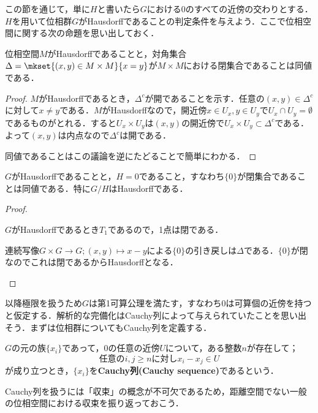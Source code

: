 この節を通じて，単に$H$と書いたら$G$における$0$のすべての近傍の交わりとする．$H$を用いて位相群$G$がHausdorffであることの判定条件を与えよう．ここで位相空間に関する次の命題を思い出しておく．

\begin{prop}
	位相空間$M$がHausdorffであることと，対角集合$\Delta=\mkset{(x,y)\in M\times M}{x=y}$が$M\times M$における閉集合であることは同値である．
\end{prop}
\begin{proof}
	$M$がHausdorffであるとき，$\Delta^c$が開であることを示す．任意の$(x,y)\in\Delta^c$に対して$x\neq y$である．$M$がHausdorffなので，開近傍$x\in U_x,y\in U_y$で$U_x\cap U_y=\emptyset$であるものがとれる．すると$U_x\times U_y$は$(x,y)$の開近傍で$U_x\times U_y\subset\Delta^c$である．よって$(x,y)$は内点なので$\Delta^c$は開である．
	
	同値であることはこの議論を逆にたどることで簡単にわかる．
\end{proof}

\begin{prop}\label{prop:位相群がHdfになる条件}
	$G$がHausdorffであることと，$H=0$であること，すなわち$\{0\}$が閉集合であることは同値である．特に$G/H$はHausdorffである．
\end{prop}

\begin{proof}
	\begin{eqv}
		\item $G$がHausdorffであるとき$T_1$であるので，1点は閉である．
		\item 連続写像$G\times G\to G;(x,y)\mapsto x-y$による$\{0\}$の引き戻しは$\Delta$である．$\{0\}$が閉なのでこれは閉であるからHausdorffとなる．
	\end{eqv}
\end{proof}

以降極限を扱うため$G$は第1可算公理を満たす，すなわち$0$は可算個の近傍を持つと仮定する．解析的な完備化はCauchy列によって与えられていたことを思い出そう．まずは位相群についてもCauchy列を定義する．

\begin{defi}[Cauchy列]
	$G$の元の族$\{x_i\}$であって，$0$の任意の近傍$U$について，ある整数$n$が存在して；
	\[\text{任意の}i,j\geq n\text{に対し} x_i-x_j\in U\]
	が成り立つとき，$\{x_i\}$を\textbf{Cauchy列(Cauchy sequence)}であるという．
\end{defi}

Cauchy列を扱うには「収束」の概念が不可欠であるため，距離空間でない一般の位相空間における収束を振り返っておこう．

